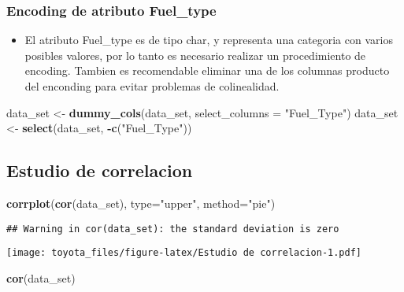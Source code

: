 \documentclass[]{article}
\newenvironment{Shaded}{\begin{snugshade}}{\end{snugshade}}
\newcommand{\DataTypeTok}[1]{\textcolor[rgb]{0.13,0.29,0.53}{#1}}
\newcommand{\KeywordTok}[1]{\textcolor[rgb]{0.13,0.29,0.53}{\textbf{#1}}}
\newcommand{\NormalTok}[1]{#1}
\newcommand{\OperatorTok}[1]{\textcolor[rgb]{0.81,0.36,0.00}{\textbf{#1}}}
\newcommand{\StringTok}[1]{\textcolor[rgb]{0.31,0.60,0.02}{#1}}
\providecommand{\tightlist}{%
  \setlength{\itemsep}{0pt}\setlength{\parskip}{0pt}}
\begin{document}
\hypertarget{encoding-de-atributo-fuel_type}{%
\subsubsection{Encoding de atributo
Fuel\_type}\label{encoding-de-atributo-fuel_type}}

\begin{itemize}
\tightlist
\item
  El atributo Fuel\_type es de tipo char, y representa una categoria con
  varios posibles valores, por lo tanto es necesario realizar un
  procedimiento de encoding. Tambien es recomendable eliminar una de los
  columnas producto del enconding para evitar problemas de colinealidad.
\end{itemize}

\begin{Shaded}
\begin{Highlighting}[]
\NormalTok{data_set <-}\StringTok{ }\KeywordTok{dummy_cols}\NormalTok{(data_set, }\DataTypeTok{select_columns =} \StringTok{"Fuel_Type"}\NormalTok{)}
\NormalTok{data_set <-}\StringTok{ }\KeywordTok{select}\NormalTok{(data_set, }\OperatorTok{-}\KeywordTok{c}\NormalTok{(}\StringTok{"Fuel_Type"}\NormalTok{))}
\end{Highlighting}
\end{Shaded}

\hypertarget{estudio-de-correlacion}{%
\subsection{Estudio de correlacion}\label{estudio-de-correlacion}}

\begin{Shaded}
\begin{Highlighting}[]
\KeywordTok{corrplot}\NormalTok{(}\KeywordTok{cor}\NormalTok{(data_set), }\DataTypeTok{type=}\StringTok{"upper"}\NormalTok{, }\DataTypeTok{method=}\StringTok{"pie"}\NormalTok{)}
\end{Highlighting}
\end{Shaded}

\begin{verbatim}
## Warning in cor(data_set): the standard deviation is zero
\end{verbatim}

\texttt{[image: toyota\_files/figure-latex/Estudio de correlacion-1.pdf]}

\begin{Shaded}
\begin{Highlighting}[]
\KeywordTok{cor}\NormalTok{(data_set)}
\end{Highlighting}
\end{Shaded}
\end{document}
